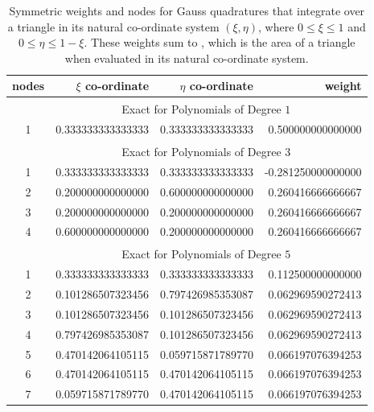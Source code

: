 \begin{table}
    \centering
    \begin{tabular}{|c|rrr|}
        \hline
        nodes & \centering $\xi$ co-ordinate \phantom{123} & 
        \centering $\eta$ co-ordinate \phantom{123} &
        weight \phantom{123456} \\ \hline
        & \multicolumn{3}{|c|}{Exact for Polynomials of Degree $1^{\phantom{|^|}}$} \\ 
        \hline
        1 & 0.333333333333333 & 0.333333333333333 & 0.500000000000000 \\ 
        \hline
        & \multicolumn{3}{|c|}{Exact for Polynomials of Degree $3^{\phantom{|^|}}$} \\ \hline
        1 & 0.333333333333333 & 0.333333333333333 & -0.281250000000000 \\
        2 & 0.200000000000000 & 0.600000000000000 & 0.260416666666667 \\ 
        3 & 0.200000000000000 & 0.200000000000000 & 0.260416666666667 \\
        4 & 0.600000000000000 & 0.200000000000000 & 0.260416666666667 \\ 
        \hline
        & \multicolumn{3}{|c|}{Exact for Polynomials of Degree $5^{\phantom{|^|}}$} \\ \hline
        1 & 0.333333333333333 & 0.333333333333333 & 0.112500000000000 \\
        2 & 0.101286507323456 & 0.797426985353087 & 0.062969590272413 \\ 
        3 & 0.101286507323456 & 0.101286507323456 & 0.062969590272413 \\
        4 & 0.797426985353087 & 0.101286507323456 & 0.062969590272413 \\
        5 & 0.470142064105115 & 0.059715871789770 & 0.066197076394253 \\ 
        6 & 0.470142064105115 & 0.470142064105115 & 0.066197076394253 \\
        7 & 0.059715871789770 & 0.470142064105115 & 0.066197076394253 \\
        \hline
    \end{tabular}
    \caption{Symmetric weights and nodes for Gauss quadratures that integrate over a triangle in its natural co-ordinate system $( \xi , \eta )$, where $0 \leq \xi \leq 1$ and $0 \leq \eta \leq 1 - \xi$.  These weights sum to , which is the area of a triangle when evaluated in its natural co-ordinate system.}
    \label{tabQuadrature2D}
\end{table}


